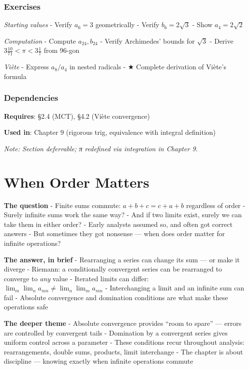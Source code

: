 \documentclass[
  10pt,
  letterpaper,
]{scrbook}
\begin{document}
\subsection{Exercises}\label{exercises-19}

\emph{Starting values} - Verify \(a_6 = 3\) geometrically - Verify
\(b_6 = 2\sqrt{3}\) - Show \(a_4 = 2\sqrt{2}\)

\emph{Computation} - Compute \(a_{24}, b_{24}\) - Verify Archimedes'
bounds for \(\sqrt{3}\) - Derive \(3\frac{10}{71} < \pi < 3\frac{1}{7}\)
from 96-gon

\emph{Viète} - Express \(a_8/a_4\) in nested radicals - ★ Complete
derivation of Viète's formula

\subsection{Dependencies}\label{dependencies-19}

\textbf{Requires}: §2.4 (MCT), §4.2 (Viète convergence)

\textbf{Used in}: Chapter 9 (rigorous trig, equivalence with integral
definition)

\emph{Note: Section deferrable; π redefined via integration in Chapter
9.}

\chapter{When Order Matters}\label{when-order-matters}

\textbf{The question} - Finite sums commute: \(a + b + c = c + a + b\)
regardless of order - Surely infinite sums work the same way? - And if
two limits exist, surely we can take them in either order? - Early
analysts assumed so, and often got correct answers - But sometimes they
got nonsense --- when does order matter for infinite operations?

\textbf{The answer, in brief} - Rearranging a series can change its sum
--- or make it diverge - Riemann: a conditionally convergent series can
be rearranged to converge to \emph{any} value - Iterated limits can
differ: \(\lim_m \lim_n a_{mn} \neq \lim_n \lim_m a_{mn}\) -
Interchanging a limit and an infinite sum can fail - Absolute
convergence and domination conditions are what make these operations
safe

\textbf{The deeper theme} - Absolute convergence provides ``room to
spare'' --- errors are controlled by convergent tails - Domination by a
convergent series gives uniform control across a parameter - These
conditions recur throughout analysis: rearrangements, double sums,
products, limit interchange - The chapter is about discipline ---
knowing exactly when infinite operations commute
\end{document}
